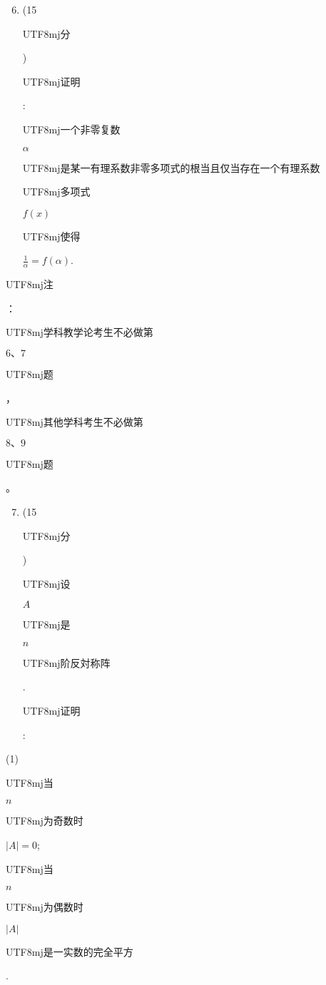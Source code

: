 \documentclass[10pt]{article}
\begin{document}
\begin{enumerate}
  \setcounter{enumi}{5}
  \item (15 \begin{CJK}{UTF8}{mj}分\end{CJK}) \begin{CJK}{UTF8}{mj}证明\end{CJK}: \begin{CJK}{UTF8}{mj}一个非零复数\end{CJK} $\alpha$ \begin{CJK}{UTF8}{mj}是某一有理系数非零多项式的根当且仅当存在一个有理系数\end{CJK} \begin{CJK}{UTF8}{mj}多项式\end{CJK} $f(x)$ \begin{CJK}{UTF8}{mj}使得\end{CJK} $\frac{1}{\alpha}=f(\alpha)$.
\end{enumerate}
\begin{CJK}{UTF8}{mj}注\end{CJK}：\begin{CJK}{UTF8}{mj}学科教学论考生不必做第\end{CJK} $6 、 7$ \begin{CJK}{UTF8}{mj}题\end{CJK}，\begin{CJK}{UTF8}{mj}其他学科考生不必做第\end{CJK} $8 、 9$ \begin{CJK}{UTF8}{mj}题\end{CJK}。

\begin{enumerate}
  \setcounter{enumi}{6}
  \item (15 \begin{CJK}{UTF8}{mj}分\end{CJK}) \begin{CJK}{UTF8}{mj}设\end{CJK} $A$ \begin{CJK}{UTF8}{mj}是\end{CJK} $n$ \begin{CJK}{UTF8}{mj}阶反対称阵\end{CJK}. \begin{CJK}{UTF8}{mj}证明\end{CJK}:
\end{enumerate}
(1) \begin{CJK}{UTF8}{mj}当\end{CJK} $n$ \begin{CJK}{UTF8}{mj}为奇数时\end{CJK} $|A|=0$; \begin{CJK}{UTF8}{mj}当\end{CJK} $n$ \begin{CJK}{UTF8}{mj}为偶数时\end{CJK} $|A|$ \begin{CJK}{UTF8}{mj}是一实数的完全平方\end{CJK}.
\end{document}
